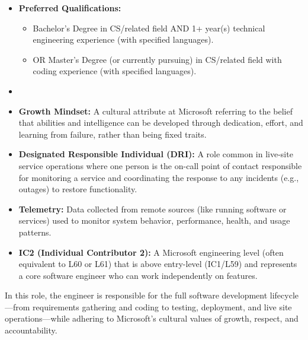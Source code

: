 \documentclass[11pt]{article}
\begin{document}
\begin{itemize}
  \item \textbf{Preferred Qualifications:}
  \begin{itemize}
    \item Bachelor's Degree in CS/related field AND 1+ year(s) technical 
      engineering experience (with specified languages).
    \item OR Master's Degree (or currently pursuing) in CS/related field 
      with coding experience (with specified languages).
  \end{itemize}
  
  \item \hrulefill
  \item \textbf{Growth Mindset:} A cultural attribute at Microsoft 
    referring to the belief that abilities and intelligence can be 
    developed through dedication, effort, and learning from failure, 
    rather than being fixed traits.
  \item \textbf{Designated Responsible Individual (DRI):} A role common 
    in live-site service operations where one person is the on-call 
    point of contact responsible for monitoring a service and 
    coordinating the response to any incidents (e.g., outages) to 
    restore functionality.
  \item \textbf{Telemetry:} Data collected from remote sources (like 
    running software or services) used to monitor system behavior, 
    performance, health, and usage patterns.
  \item \textbf{IC2 (Individual Contributor 2):} A Microsoft engineering 
    level (often equivalent to L60 or L61) that is above entry-level 
    (IC1/L59) and represents a core software engineer who can work 
    independently on features.
\end{itemize}

In this role, the engineer is responsible for the full software 
development lifecycle—from requirements gathering and coding to testing, 
deployment, and live site operations—while adhering to Microsoft's 
cultural values of growth, respect, and accountability.
\end{document}
